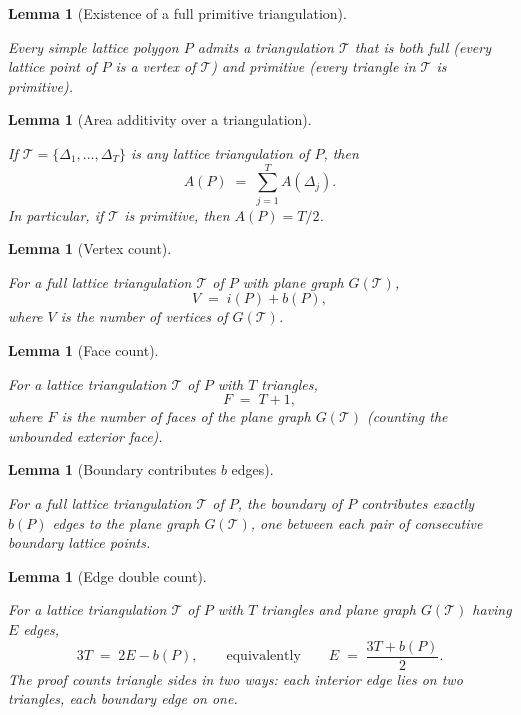 \documentclass[11pt]{article}
\providecommand{\uses}[1]{}
\providecommand{\lean}[1]{}
\newtheorem{lemma}[theorem]{Lemma}
\theoremstyle{definition}
\begin{document}
\begin{lemma}[Existence of a full primitive triangulation]
\label{lem:exists-primitive-triangulation}
\lean{Pick.exists_primitive_lattice_triangulation}
\uses{def:simple-polygon, def:triangulation, def:primitive-triangle}
Every simple lattice polygon $P$ admits a triangulation $\mathcal{T}$ that is
both \emph{full} (every lattice point of $P$ is a vertex of $\mathcal{T}$)
and \emph{primitive} (every triangle in $\mathcal{T}$ is primitive).
\end{lemma}

\begin{lemma}[Area additivity over a triangulation]
\label{lem:area-additive}
\lean{Pick.area_eq_sum_triangle_areas}
\uses{def:triangulation, def:area}
If $\mathcal{T} = \{\Delta_1, \dots, \Delta_T\}$ is any lattice triangulation
of $P$, then
\[
A(P) \;=\; \sum_{j=1}^{T} A(\Delta_j).
\]
In particular, if $\mathcal{T}$ is primitive, then $A(P) = T/2$.
\end{lemma}

\begin{lemma}[Vertex count]
\label{lem:vertex-count}
\lean{Pick.vertex_count}
\uses{def:plane-graph, def:interior-points, def:boundary-points,
lem:exists-primitive-triangulation}
For a full lattice triangulation $\mathcal{T}$ of $P$ with plane graph
$G(\mathcal{T})$,
\[
V \;=\; i(P) + b(P),
\]
where $V$ is the number of vertices of $G(\mathcal{T})$.
\end{lemma}

\begin{lemma}[Face count]
\label{lem:face-count}
\lean{Pick.face_count}
\uses{def:plane-graph, def:triangulation}
For a lattice triangulation $\mathcal{T}$ of $P$ with $T$ triangles,
\[
F \;=\; T + 1,
\]
where $F$ is the number of faces of the plane graph $G(\mathcal{T})$
(counting the unbounded exterior face).
\end{lemma}

\begin{lemma}[Boundary contributes $b$ edges]
\label{lem:boundary-edge-count}
\lean{Pick.boundary_edge_count}
\uses{def:plane-graph, def:boundary-points,
lem:exists-primitive-triangulation}
For a full lattice triangulation $\mathcal{T}$ of $P$, the boundary of $P$
contributes exactly $b(P)$ edges to the plane graph $G(\mathcal{T})$, one
between each pair of consecutive boundary lattice points.
\end{lemma}

\begin{lemma}[Edge double count]
\label{lem:edge-double-count}
\lean{Pick.edge_double_count}
\uses{def:plane-graph, def:triangulation, lem:boundary-edge-count}
For a lattice triangulation $\mathcal{T}$ of $P$ with $T$ triangles and plane
graph $G(\mathcal{T})$ having $E$ edges,
\[
3T \;=\; 2E - b(P),
\qquad\text{equivalently}\qquad
E \;=\; \frac{3T + b(P)}{2}.
\]
The proof counts triangle sides in two ways: each interior edge lies on two
triangles, each boundary edge on one.
\end{lemma}
\end{document}
